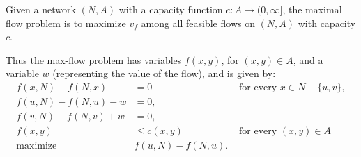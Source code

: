 \documentclass{amsbook}
\theoremstyle{definition}
\theoremstyle{remark}
\begin{document}
Given a network $(N,A)$ with a capacity function $c:A\to (0,\infty]$, the maximal flow problem is to maximize $v_f$ among all feasible flows on $(N,A)$ with capacity $c$.

Thus the max-flow problem has variables $f(x,y)$, for $(x,y)\in A$, and a variable $w$ (representing the value of the flow), and is given by:
\begin{equation}
  \label{eq:max-flow}
  \tag{F}
  \begin{array}{rll}
    f(x,N)-f(N,x)&=0 &\text{ for every $x\in N-\{u,v\}$},\\
    f(u,N)-f(N,u)-w&=0,&\\
    f(v,N)-f(N,v)+w&=0,&\\
    f(x,y)&\leq c(x,y)&\text{ for every $(x,y)\in A$}\\
    \hline
    \text{maximize } & f(u,N)-f(N,u). &
  \end{array}
\end{equation}
\end{document}
